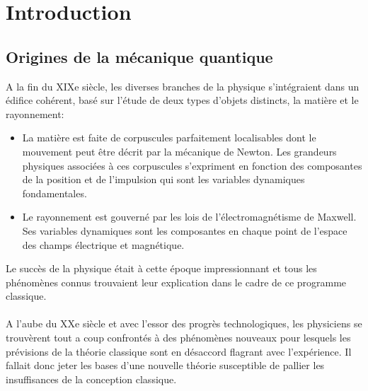 \chapter*{Introduction}

\section*{Origines de la mécanique quantique}
A la fin du XIXe siècle, les diverses branches de la physique s'intégraient dans un édifice cohérent, basé sur l'étude de deux types d’objets distincts, la matière et le rayonnement:
\begin{itemize}
	\item La matière est faite de corpuscules parfaitement localisables dont le mouvement peut être décrit par la mécanique de Newton. Les grandeurs physiques associées à ces corpuscules s’expriment en fonction des composantes de la position et de l’impulsion qui sont les variables dynamiques fondamentales.
	\item Le rayonnement est gouverné par les lois de l'électromagnétisme de Maxwell. Ses variables dynamiques sont les composantes en chaque point de l’espace des champs électrique et magnétique.
\end{itemize}
Le succès de la physique était à cette époque impressionnant et tous les phénomènes connus trouvaient leur explication dans le cadre de ce programme classique.\\\\
A l’aube du XXe siècle et avec l’essor des progrès technologiques, les physiciens se trouvèrent tout a coup confrontés à des phénomènes nouveaux pour lesquels les prévisions de la théorie classique sont en désaccord flagrant avec l'expérience. Il fallait donc jeter les bases d’une nouvelle théorie susceptible de pallier les insuffisances de la conception classique.

